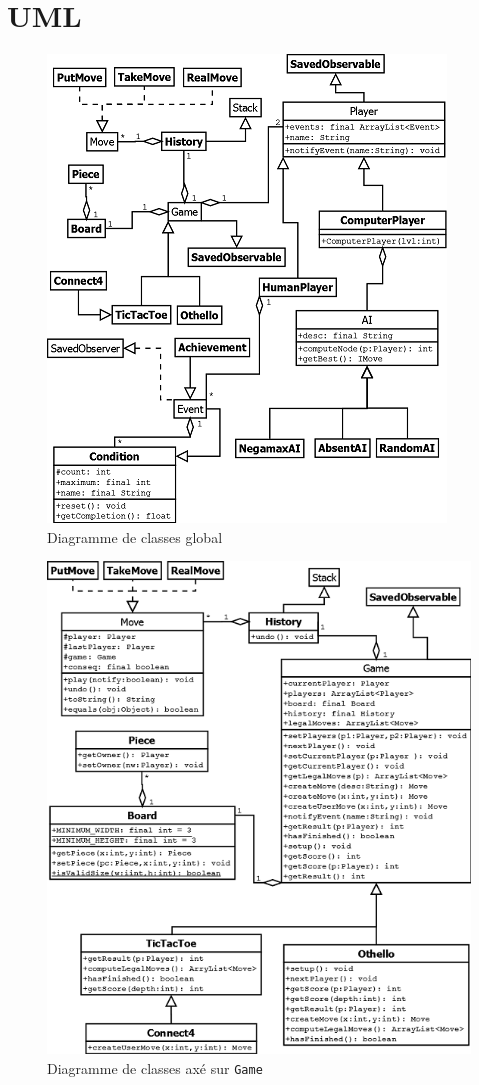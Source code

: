 \section{UML}

\begin{figure}[ht]
\centering
\includegraphics{../uml_global.png}
\caption{Diagramme de classes global}
\label{fig:umlGlobal}
\end{figure}
\begin{figure}[ht]
\centering
\includegraphics{../uml_Game.png}
\caption{Diagramme de classes axé sur \texttt{Game}}
\label{fig:umlGame}
\end{figure}